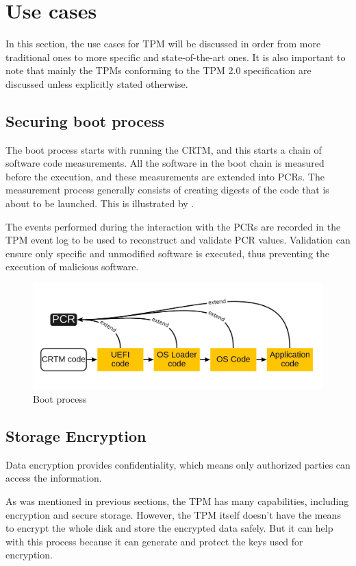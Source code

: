 \section{Use cases}
In this section, the use cases for TPM will be discussed in order from more traditional ones to more specific and state-of-the-art ones. It is also important to note that mainly the TPMs conforming to the TPM 2.0 specification are discussed unless explicitly stated otherwise.

\subsection{Securing boot process}
The boot process starts with running the CRTM, and this starts a chain of software code measurements. All the software in the boot chain is measured before the execution, and these measurements are extended into PCRs. The measurement process generally consists of creating digests of the code that is about to be launched. This is illustrated by . 

The events performed during the interaction with the PCRs are recorded in the TPM event log \cite{tcg_tpm2_pcspec} to be used to reconstruct and validate PCR values. Validation can ensure only specific and unmodified software is executed, thus preventing the execution of malicious software.

\begin{figure}[H]
    \centering
    \includegraphics[width=\textwidth]{img/boot.jpg}
    \caption{Boot process}
    \label{fig:boot}
\end{figure}

\subsection{Storage Encryption}
Data encryption provides confidentiality, which means only authorized parties can access the information. 

As was mentioned in previous sections, the TPM has many capabilities, including encryption and secure storage. However, the TPM itself doesn't have the means to encrypt the whole disk and store the encrypted data safely. But it can help with this process because it can generate and protect the keys used for encryption.

